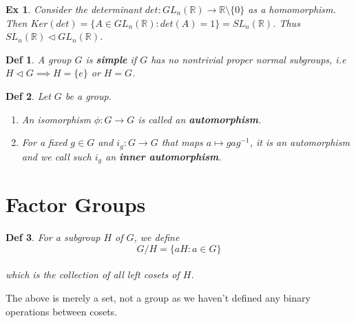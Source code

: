 \documentclass[paper=a4, fontsize=11pt]{scrartcl}
\newtheorem{definition}{Def}
\newtheorem{example}{Ex}
\begin{document}
\vspace{0.15in}

\begin{example}
	Consider the determinant $det:GL_n(\mathbb{R}) \to \mathbb{R}\setminus\{0\}$ as a homomorphism. Then $Ker(det)=\{A\in GL_n(\mathbb{R}) : det(A)=1 \}=SL_n(\mathbb{R})$. Thus $SL_n(\mathbb{R}) \triangleleft GL_n(\mathbb{R})$.
\end{example}

\vspace{0.15in}

\begin{definition}
	A group $G$ is \textbf{simple} if $G$ has no nontrivial proper normal subgroups, i.e $H \triangleleft G \implies H=\{e\}$ or $H=G$.
\end{definition}

\vspace{0.15in}

\begin{definition}
Let $G$ be a group.
\begin{enumerate}[label=\arabic*)]
	\item An isomorphism $\phi:G \to G$ is called an \textbf{automorphism}.
	\item For a fixed $g\in G$ and $i_g : G \to G$ that maps $a \mapsto gag^{-1}$, it is an automorphism and we call such $i_g$ an \textbf{inner automorphism}.
\end{enumerate}
\end{definition}

\vspace{0.25in}
\section{Factor Groups}
\vspace{0.25in}

\begin{definition}
	For a subgroup $H$ of $G$, we define \\
	\begin{equation}\nonumber
		G/H = \{aH : a\in G \}
	\end{equation}\\
	which is the collection of all left cosets of $H$.\\
\end{definition}

The above is merely a set, not a group as we haven't defined any binary operations between cosets. \\
\end{document}
